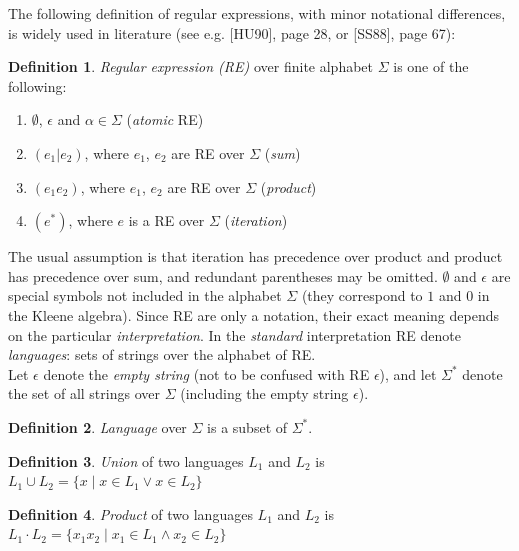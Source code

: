\documentclass{article}
\newcommand{\Xin}{\!\in\!}
\theoremstyle{definition}
\newtheorem{Xdef}{Definition}
\begin{document}
\begin{multicols}{2}
The following definition of regular expressions, with minor notational differences, is widely used in literature
(see e.g. [HU90], page 28, or [SS88], page 67):

    \begin{Xdef}\label{re}
    \emph{Regular expression (RE)} over finite alphabet $\Sigma$ is one of the following:
    \begin{enumerate}
        \medskip
        \item[] $\emptyset$, $\epsilon$ and $\alpha \Xin \Sigma$ (\emph{atomic} RE)
        \item[] $(e_1 | e_2)$, where $e_1$, $e_2$ are RE over $\Sigma$ (\emph{sum})
        \item[] $(e_1 e_2)$,   where $e_1$, $e_2$ are RE over $\Sigma$ (\emph{product})
        \item[] $(e^*)$,       where $e$ is a RE over $\Sigma$ (\emph{iteration})
        \medskip
    \end{enumerate}
    \end{Xdef}

The usual assumption is that iteration has precedence over product and product has precedence over sum,
and redundant parentheses may be omitted.
$\emptyset$ and $\epsilon$ are special symbols not included in the alphabet $\Sigma$ (they correspond to $1$ and $0$ in the Kleene algebra).
Since RE are only a notation, their exact meaning depends on the particular \emph{interpretation}.
In the \emph{standard} interpretation RE denote \emph{languages}: sets of strings over the alphabet of RE.
\\

Let $\epsilon$ denote the \emph{empty string} (not to be confused with RE $\epsilon$),
and let $\Sigma^*$ denote the set of all strings over $\Sigma$ (including the empty string $\epsilon$).

    \begin{Xdef}
    \emph{Language} over $\Sigma$ is a subset of $\Sigma^*$.
    \end{Xdef}

    \begin{Xdef}\label{langunion}
    \emph{Union} of two languages $L_1$ and $L_2$ is
    $L_1 \cup L_2 = \{ x \mid x \Xin L_1 \vee x \Xin L_2 \}$
    \end{Xdef}

    \begin{Xdef}\label{langproduct}
    \emph{Product} of two languages $L_1$ and $L_2$ is
    $L_1 \cdot L_2 = \{ x_1 x_2 \mid x_1 \Xin L_1 \wedge x_2 \Xin L_2 \}$
    \end{Xdef}


\end{multicols}
\end{document}
